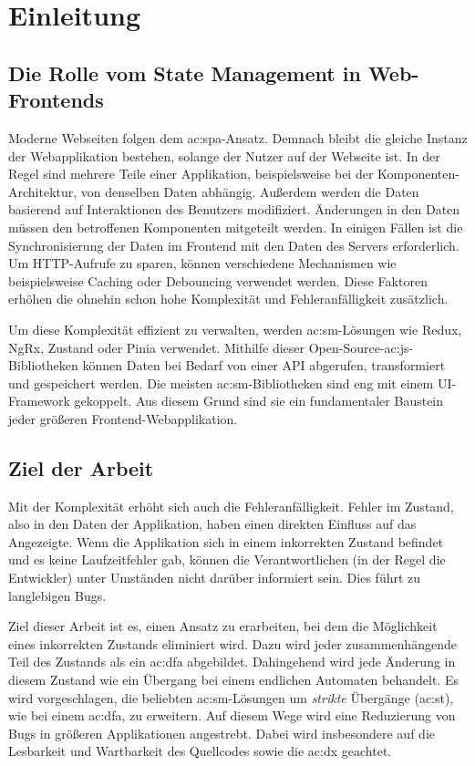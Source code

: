 \chapter{Einleitung}

\section{Die Rolle vom State Management in Web-Frontends}

Moderne Webseiten folgen dem \acrlong{ac:spa}-Ansatz. Demnach bleibt die gleiche Instanz der Webapplikation bestehen, solange der Nutzer auf der Webseite ist. In der Regel sind mehrere Teile einer Applikation, beispielsweise bei der Komponenten-Architektur, von denselben Daten abhängig. Außerdem werden die Daten basierend auf Interaktionen des Benutzers modifiziert. Änderungen in den Daten müssen den betroffenen Komponenten mitgeteilt werden. In einigen Fällen ist die Synchronisierung der Daten im Frontend mit den Daten des Servers erforderlich. Um HTTP-Aufrufe zu sparen, können verschiedene Mechanismen wie beispielsweise Caching oder Debouncing verwendet werden. Diese Faktoren erhöhen die ohnehin schon hohe Komplexität und Fehleranfälligkeit zusätzlich.

Um diese Komplexität effizient zu verwalten, werden \acrlong{ac:sm}-Lösungen wie Redux, NgRx, Zustand oder Pinia verwendet. Mithilfe dieser Open-Source-\acrlong{ac:js}-Bibliotheken können Daten bei Bedarf von einer API abgerufen, transformiert und gespeichert werden. Die meisten \acrlong{ac:sm}-Bibliotheken sind eng mit einem UI-Framework gekoppelt. Aus diesem Grund sind sie ein fundamentaler Baustein jeder größeren Frontend-Webapplikation.

\section{Ziel der Arbeit}

Mit der Komplexität erhöht sich auch die Fehleranfälligkeit. Fehler im Zustand, also in den Daten der Applikation, haben einen direkten Einfluss auf das Angezeigte. Wenn die Applikation sich in einem inkorrekten Zustand befindet und es keine Laufzeitfehler gab, können die Verantwortlichen (in der Regel die Entwickler) unter Umständen nicht darüber informiert sein. Dies führt zu langlebigen Bugs.

Ziel dieser Arbeit ist es, einen Ansatz zu erarbeiten, bei dem die Möglichkeit eines inkorrekten Zustands eliminiert wird. Dazu wird jeder zusammenhängende Teil des Zustands als ein \acrlong{ac:dfa} abgebildet. Dahingehend wird jede Änderung in diesem Zustand wie ein Übergang bei einem endlichen Automaten behandelt. Es wird vorgeschlagen, die beliebten \acrlong{ac:sm}-Lösungen um \textit{strikte} Übergänge (\acrshort{ac:st}), wie bei einem \acrshort{ac:dfa}, zu erweitern. Auf diesem Wege wird eine Reduzierung von Bugs in größeren Applikationen angestrebt. Dabei wird insbesondere auf die Lesbarkeit und Wartbarkeit des Quellcodes sowie die \acrlong{ac:dx} geachtet.


